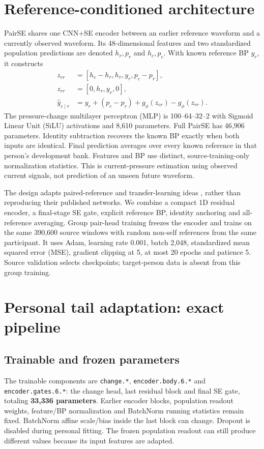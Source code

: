 \documentclass[conference]{IEEEtran}
\begin{document}
\section{Reference-conditioned architecture}
PairSE shares one CNN+SE encoder between an earlier reference waveform and a
currently observed waveform. Its 48-dimensional features and two standardized
population predictions are denoted $h_r,p_r$ and $h_c,p_c$. With known reference
BP $y_r$, it constructs
\begin{align}
z_{cr}&=[h_c-h_r,h_r,y_r,p_c-p_r],\\
z_{rr}&=[0,h_r,y_r,0],\\
\widehat y_{c\mid r}&=y_r+(p_c-p_r)+g_\phi(z_{cr})-g_\phi(z_{rr}).
\end{align}
The pressure-change multilayer perceptron (MLP) is 100--64--32--2 with Sigmoid
Linear Unit (SiLU) activations and 8,610 parameters. Full PairSE has 46,906
parameters. Identity subtraction recovers the known BP exactly when both inputs
are identical. Final prediction averages over every known reference in that
person's development bank. Features and BP use distinct, source-training-only
normalization statistics. This is current-pressure estimation using observed
current signals, not prediction of an unseen future waveform.

The design adapts paired-reference and transfer-learning ideas
\cite{mekonnen2024,schlesinger2020,leitner2022}, rather than reproducing their
published networks. We combine a compact 1D residual encoder, a final-stage
SE gate, explicit reference BP, identity anchoring and all-reference averaging.
Group pair-head training freezes the encoder and trains on the same 390,600
source windows with random non-self references from the same participant.
It uses Adam, learning rate 0.001, batch 2,048, standardized mean squared error
(MSE), gradient clipping at 5, at most 20 epochs and patience 5. Source validation
selects checkpoints; target-person data is absent from this group training.

\section{Personal tail adaptation: exact pipeline}
\subsection{Trainable and frozen parameters}
The trainable components are \texttt{change.*}, \texttt{encoder.body.6.*} and
\texttt{encoder.gates.6.*}: the change head, last residual block and final SE
gate, totaling \textbf{33,336 parameters}. Earlier encoder blocks, population
readout weights, feature/BP normalization and BatchNorm running statistics
remain fixed. BatchNorm affine scale/bias inside the last block can change.
Dropout is disabled during personal fitting. The frozen population readout
can still produce different values because its input features are adapted.
\end{document}
